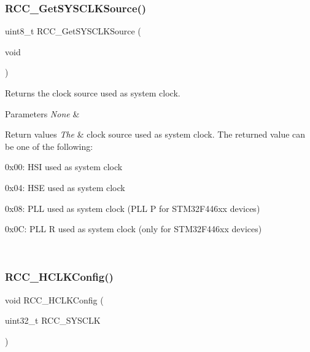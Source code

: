 \subsubsection{\texorpdfstring{R\+C\+C\+\_\+\+Get\+S\+Y\+S\+C\+L\+K\+Source()}{RCC\_GetSYSCLKSource()}}
{\footnotesize\ttfamily uint8\+\_\+t R\+C\+C\+\_\+\+Get\+S\+Y\+S\+C\+L\+K\+Source (\begin{DoxyParamCaption}\item[{void}]{ }\end{DoxyParamCaption})}



Returns the clock source used as system clock. 


\begin{DoxyParams}{Parameters}
{\em None} & \\
\hline
\end{DoxyParams}

\begin{DoxyRetVals}{Return values}
{\em The} & clock source used as system clock. The returned value can be one of the following\+:
\begin{DoxyItemize}
\item 0x00\+: H\+SI used as system clock
\item 0x04\+: H\+SE used as system clock
\item 0x08\+: P\+LL used as system clock (P\+LL P for S\+T\+M32\+F446xx devices)
\item 0x0C\+: P\+LL R used as system clock (only for S\+T\+M32\+F446xx devices) 
\end{DoxyItemize}\\
\hline
\end{DoxyRetVals}
\mbox{\label{group___r_c_c_ga9d0aec72e236c6cdf3a3a82dfb525491}} 
\subsubsection{\texorpdfstring{R\+C\+C\+\_\+\+H\+C\+L\+K\+Config()}{RCC\_HCLKConfig()}}
{\footnotesize\ttfamily void R\+C\+C\+\_\+\+H\+C\+L\+K\+Config (\begin{DoxyParamCaption}\item[{uint32\+\_\+t}]{R\+C\+C\+\_\+\+S\+Y\+S\+C\+LK }\end{DoxyParamCaption})}




